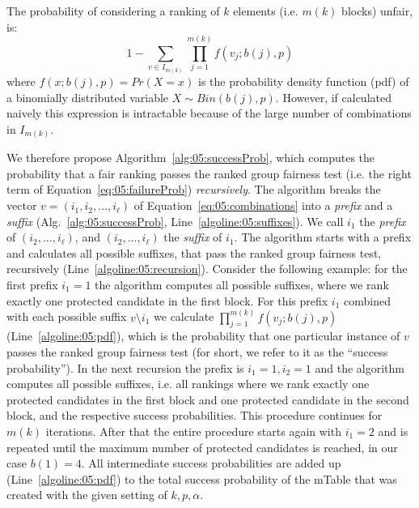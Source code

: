 The probability of considering a ranking of $k$ elements (i.e. $m(k)$ blocks) unfair, is:
\begin{equation}
	\label{eq:05:failureProb}
	1 - \sum_{v \in I_{m(k)}} \prod_{j=1}^{m(k)} f(v_j; b(j), p)
\end{equation}
%
\noindent where $f(x;b(j),p) = Pr(X = x)$ is the probability density function (pdf) of a binomially distributed variable $X \sim Bin(b(j), p)$.
%
However, if calculated naively this expression is intractable because of the large number of combinations in $I_{m(k)}$.


We therefore propose Algorithm~\ref{alg:05:successProb}, which computes the probability that a fair ranking passes the ranked group fairness test (i.e. the right term of Equation~\ref{eq:05:failureProb}) \emph{recursively}.
%
%
%
%
The algorithm breaks the vector $v = (i_1, i_2, \ldots ,i_{\ell})$ of Equation~\ref{eq:05:combinations} into a \textit{prefix} and a \textit{suffix} (Alg.~\ref{alg:05:successProb}, Line~\ref{algoline:05:suffixes}).
%
We call $i_1$ the \textit{prefix} of $(i_2, \ldots, i_{\ell})$, and $(i_2, \ldots, i_{\ell})$ the \textit{suffix} of $i_1$.
%
The algorithm starts with a prefix and calculates all possible suffixes, that pass the ranked group fairness test, recursively (Line~\ref{algoline:05:recursion}).
%
Consider the following example: for the first prefix $i_1 = 1$ the algorithm computes all possible suffixes, where we rank exactly one protected candidate in the first block.
%
For this prefix $i_1$ combined with each possible suffix $v \setminus i_1$ we calculate $\prod_{j=1}^{m(k)} f(v_j; b(j), p)$ (Line~\ref{algoline:05:pdf}), which is the probability that one particular instance of $v$ passes the ranked group fairness test (for short, we refer to it as the ``success probability'').
%
In the next recursion the prefix is $i_1=1, i_2 =1$ and the algorithm computes all possible suffixes, i.e. all rankings where we rank exactly one protected candidates in the first block and one protected candidate in the second block, and the respective success probabilities.
%
This procedure continues for $m(k)$ iterations.
%
After that the entire procedure starts again with $i_1=2$ and is repeated until the maximum number of protected candidates is reached, in our case $b(1)=4$.
%
All intermediate success probabilities are added up (Line~\ref{algoline:05:pdf}) to the total success probability of the mTable that was created with the given setting of $k, p, \alpha$.

